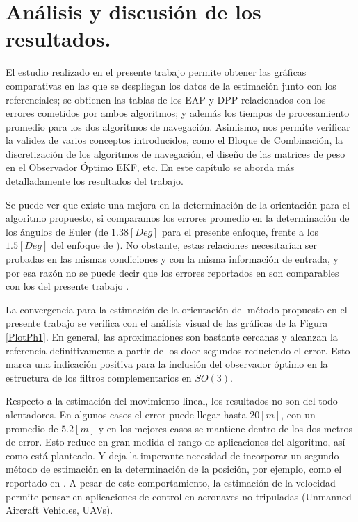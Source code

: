 \documentclass[conference]{IEEEtran}
\begin{document}
\section{Análisis y discusión de los resultados.}
El estudio realizado en el presente trabajo permite obtener las gráficas comparativas en las que se despliegan los datos de la estimación junto con los referenciales; se obtienen las tablas de los EAP y DPP relacionados con los errores cometidos por ambos algoritmos; y además los tiempos de procesamiento promedio para los dos algoritmos de navegación. Asimismo, nos permite verificar la validez de varios conceptos introducidos, como el Bloque de Combinación, la discretización de los algoritmos de navegación, el diseño de las matrices de peso en el Observador Óptimo EKF, etc. En este capítulo se aborda más detalladamente los resultados del trabajo.\par
Se puede ver que existe una mejora en la determinación de la orientación para el algoritmo propuesto, si comparamos los errores promedio en la determinación de los ángulos de Euler (de $1.38[Deg]$ para el presente enfoque, frente a los $1.5[Deg]$ del enfoque de \cite{Cai2011}). No obstante, estas relaciones necesitarían ser probadas en las mismas condiciones y con la misma información de entrada, y por esa razón no se puede decir que los errores reportados en \cite{Cai2011} son comparables con los del presente trabajo .\par
La convergencia para la estimación de la orientación del método propuesto en el presente trabajo se verifica con el análisis visual de las gráficas de la Figura \ref{PlotPh1}. En general, las aproximaciones son bastante cercanas y alcanzan la referencia definitivamente a partir de los doce segundos reduciendo el error. Esto marca una indicación positiva para la inclusión del observador óptimo en la estructura de los filtros complementarios en $SO(3)$.\par
Respecto a la estimación del movimiento lineal, los resultados no son del todo alentadores. En algunos casos el error puede llegar hasta $20[m]$, con un promedio de $5.2[m]$ y en los mejores casos se mantiene dentro de los dos metros de error. Esto reduce en gran medida el rango de aplicaciones del algoritmo, así como está planteado. Y deja la imperante necesidad de incorporar un segundo método de estimación en la determinación de la posición, por ejemplo, como el reportado en \cite{Merwe2004}. A pesar de este comportamiento, la estimación de la velocidad permite pensar en aplicaciones de control en aeronaves no tripuladas (Unmanned Aircraft Vehicles, UAVs).\par
\end{document}
